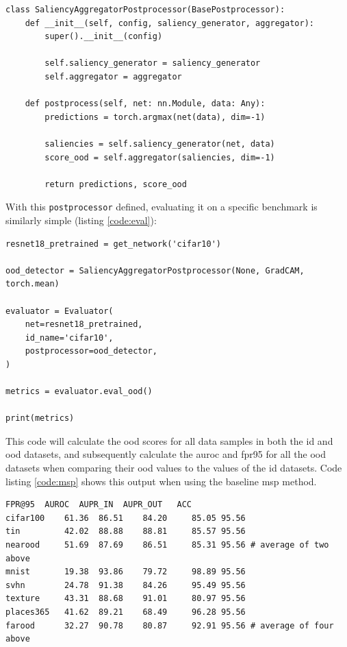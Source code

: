 \documentclass[UKenglish]{uiomasterthesis} %
\theoremstyle{definition}
\begin{document}
\begin{lstlisting}[style=pythonstyle, caption={Source code listing for the Aggregate of Saliency \ac{ood} detector}, captionpos=b, label={code:aggregate}]
class SaliencyAggregatorPostprocessor(BasePostprocessor):
    def __init__(self, config, saliency_generator, aggregator):
        super().__init__(config)

        self.saliency_generator = saliency_generator
        self.aggregator = aggregator

    def postprocess(self, net: nn.Module, data: Any):
        predictions = torch.argmax(net(data), dim=-1)

        saliencies = self.saliency_generator(net, data)
        score_ood = self.aggregator(saliencies, dim=-1)

        return predictions, score_ood
\end{lstlisting}

With this \texttt{postprocessor} defined, evaluating it on a specific benchmark is similarly simple (listing \ref{code:eval}):

\begin{lstlisting}[style=pythonstyle, caption={Source code listing for evaluating methods within the OpenOOD framework}, captionpos=b, label={code:eval}]
resnet18_pretrained = get_network('cifar10')

ood_detector = SaliencyAggregatorPostprocessor(None, GradCAM, torch.mean)

evaluator = Evaluator(
    net=resnet18_pretrained,
    id_name='cifar10',
    postprocessor=ood_detector,
)

metrics = evaluator.eval_ood()

print(metrics)
\end{lstlisting}

This code will calculate the \ac{ood} scores for all data samples in both the \ac{id} and \ac{ood} datasets, and subsequently calculate the \ac{auroc} and \ac{fpr95} for all the \ac{ood} datasets when comparing their \ac{ood} values to the values of the \ac{id} datasets. Code listing \ref{code:msp} shows this output when using the baseline \ac{msp} method.

\begin{lstlisting}[style=pythonstyle, caption={Output of calling \texttt{evaluator.eval\_ood} with CIFAR10 as the benchmark and \ac{msp} as the detector}, captionpos=b, label={code:msp}]
           FPR@95  AUROC  AUPR_IN  AUPR_OUT   ACC
cifar100    61.36  86.51    84.20     85.05 95.56
tin         42.02  88.88    88.81     85.57 95.56
nearood     51.69  87.69    86.51     85.31 95.56 # average of two above
mnist       19.38  93.86    79.72     98.89 95.56
svhn        24.78  91.38    84.26     95.49 95.56
texture     43.31  88.68    91.01     80.97 95.56
places365   41.62  89.21    68.49     96.28 95.56
farood      32.27  90.78    80.87     92.91 95.56 # average of four above
\end{lstlisting}
\end{document}

